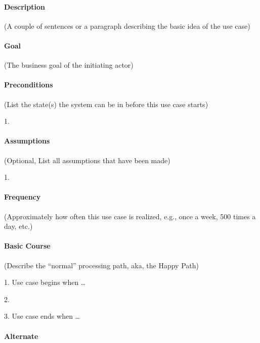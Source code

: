 \documentclass{report}
\begin{document}
  \paragraph{Description}

  (A couple of sentences or a paragraph describing the basic idea of the use case)



  \paragraph{Goal}

  (The business goal of the initiating actor)



  \paragraph{Preconditions}

  (List the state(s) the system can be in before this use case starts)

  1.



  \paragraph{Assumptions}

  (Optional, List all assumptions that have been made)

  1.



  \paragraph{Frequency}

  (Approximately how often this use case is realized, e.g., once a week, 500 times a day, etc.)



  \paragraph{Basic Course}

  (Describe the “normal” processing path, aka, the Happy Path)

  1. Use case begins when …

  2.

  3. Use case ends when …


  \paragraph{Alternate}
\end{document}
